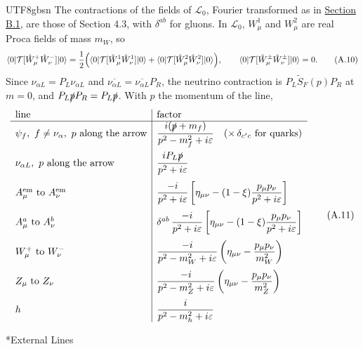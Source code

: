 \documentclass[11pt,a4paper,oneside]{report}
\makeatletter
\newcommand\topic{\@startsection{paragraph}{4}{\z@}{-1.7ex plus -.3ex}{.5ex}{\normalfont\normalsize\bfseries\itshape\boldmath}*}
\makeatother
\begin{document}
\begin{CJK*}{UTF8}{gbsn}
The contractions of the fields of $\mathcal L_0$, Fourier transformed as in \hyperref[fourier-transform]{Section B.1}, are those of Section 4.3, with $\delta^{ab}$ for gluons. In $\mathcal L_0$, $W^1_\mu$ and $W^2_\mu$ are real Proca fields of mass $m_W$, so
\begin{equation*}
\langle0|\mathcal T[\hat W^+_\mu\hat W^-_\nu]|0\rangle=\frac12\Bigl(\langle0|\mathcal T[\hat W^1_\mu\hat W^1_\nu]|0\rangle+\langle0|\mathcal T[\hat W^2_\mu\hat W^2_\nu]|0\rangle\Bigr),\qquad
\langle0|\mathcal T[\hat W^\pm_\mu\hat W^\pm_\nu]|0\rangle=0 .
\tag{A.10}\label{eq:A.10}
\end{equation*}
Since $\nu_{\alpha L}=P_L\nu_{\alpha L}$ and $\overline{\nu_{\alpha L}}=\overline{\nu_{\alpha L}}P_R$, the neutrino contraction is $P_L\widetilde S_F(p)P_R$ at $m=0$, and $P_L\slashed{p}P_R=P_L\slashed{p}$. With $p$ the momentum of the line,
\begin{equation*}
\begin{array}{l|l}
\text{line}&\text{factor}\\ \hline
\psi_f,\ f\neq\nu_\alpha,\ p\text{ along the arrow}&\dfrac{i(\slashed{p}+m_f)}{p^2-m_f^2+i\varepsilon}\quad(\times\,\delta_{c'c}\text{ for quarks})\\[12pt]
\nu_{\alpha L},\ p\text{ along the arrow}&\dfrac{iP_L\slashed{p}}{p^2+i\varepsilon}\\[12pt]
A^{\mathrm{em}}_\mu\text{ to }A^{\mathrm{em}}_\nu&\dfrac{-i}{p^2+i\varepsilon}\left[\eta_{\mu\nu}-(1-\xi)\dfrac{p_\mu p_\nu}{p^2+i\varepsilon}\right]\\[12pt]
A^a_\mu\text{ to }A^b_\nu&\delta^{ab}\,\dfrac{-i}{p^2+i\varepsilon}\left[\eta_{\mu\nu}-(1-\xi)\dfrac{p_\mu p_\nu}{p^2+i\varepsilon}\right]\\[12pt]
W^+_\mu\text{ to }W^-_\nu&\dfrac{-i}{p^2-m_W^2+i\varepsilon}\left(\eta_{\mu\nu}-\dfrac{p_\mu p_\nu}{m_W^2}\right)\\[12pt]
Z_\mu\text{ to }Z_\nu&\dfrac{-i}{p^2-m_Z^2+i\varepsilon}\left(\eta_{\mu\nu}-\dfrac{p_\mu p_\nu}{m_Z^2}\right)\\[12pt]
h&\dfrac{i}{p^2-m_h^2+i\varepsilon}
\end{array}
\tag{A.11}\label{eq:A.11}
\end{equation*}

\topic{External Lines}


\end{CJK*}
\end{document}

